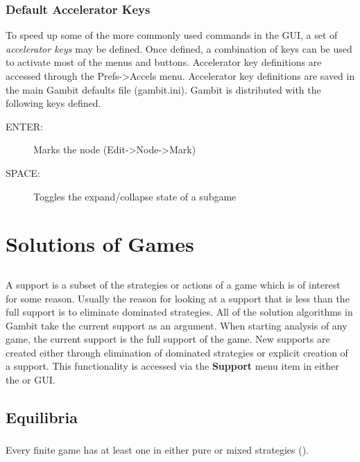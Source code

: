 \subsection{Default Accelerator Keys}\label{ExtFormDefAccl}
To speed up some of the more commonly used commands in the GUI, a set of
{\em accelerator keys} may be defined.  Once defined, a combination of keys
can be used to activate most of the menus and buttons.  Accelerator key
definitions are accessed through the Prefs->Accels menu.  Accelerator key
definitions are saved in the main Gambit defaults file (gambit.ini).  Gambit
is distributed with the following keys defined.
\begin{description}
\item[ENTER:] Marks the node (Edit->Node->Mark)
\item[SPACE:] Toggles the expand/collapse state of a subgame
\end{description}

\chapter{Solutions of Games}

\section{}\label{supportsec}

A support is a subset of the strategies or actions of a game which is
of interest for some reason.  Usually the reason for looking at a
support that is less than the full support is to eliminate dominated
strategies.  All of the solution algorithms in Gambit take the current
support as an argument.  When starting analysis of any game, the
current support is the full support of the game.  New supports are
created either through elimination of dominated strategies or explicit
creation of a support.  This functionality is accessed via the {\bf
Support} menu item in either the  or
 GUI.

\section{Equilibria}

\subsection{}\label{nashsec}
Every finite game has at least one  in either pure or mixed strategies
(\cite{Nash:1950}).


